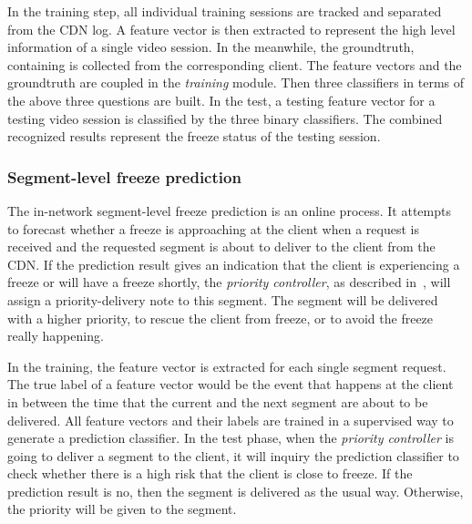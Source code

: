 \documentclass[journal]{IEEEtran}
\begin{document}
In the training step, all individual training sessions are tracked and separated from the CDN log. A feature vector is then extracted to represent the high level information of a single video session. In the meanwhile, the groundtruth, containing is collected from the corresponding client. The feature vectors and the groundtruth are coupled in the {\it training} module. Then three classifiers in terms of the above three questions are built. In the test, a testing feature vector for a testing video session is classified by the three binary classifiers. The combined recognized results represent the freeze status of the testing session.
  
\subsubsection{Segment-level freeze prediction}
The in-network segment-level freeze prediction is an online process. It attempts to forecast whether a freeze is approaching at the client when a request is received and the requested segment is about to deliver to the client from the CDN. If the prediction result gives an indication that the client is experiencing a freeze or will have a freeze shortly, the {\it priority controller}, as described in~\cite{Petrangeli:qcman15}, will assign a priority-delivery note to this segment. The segment will be delivered with a higher priority, to rescue the client from freeze, or to avoid the freeze really happening.

In the training, the feature vector is extracted for each single segment request. The true label of a feature vector would be the event that happens at the client in between the time that the current and the next segment are about to be delivered. All feature vectors and their labels are trained in a supervised way to generate a prediction classifier. In the test phase, when the {\it priority controller} is going to deliver a segment to the client, it will inquiry the prediction classifier to check whether there is a high risk that the client is close to freeze. If the prediction result is no, then the segment is delivered as the usual way. Otherwise, the priority will be given to the segment. 

\end{document}

